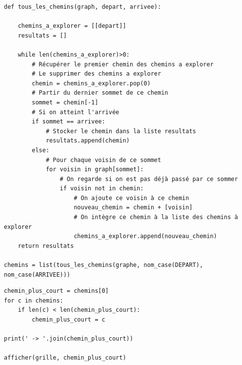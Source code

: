 \reponse{}

\begin{verbatim}
def tous_les_chemins(graph, depart, arrivee):

    chemins_a_explorer = [[depart]]
    resultats = []

    while len(chemins_a_explorer)>0:
        # Récupérer le premier chemin des chemins a explorer
        # Le supprimer des chemins a explorer
        chemin = chemins_a_explorer.pop(0)
        # Partir du dernier sommet de ce chemin
        sommet = chemin[-1]
        # Si on atteint l'arrivée
        if sommet == arrivee:
            # Stocker le chemin dans la liste resultats
            resultats.append(chemin)
        else:
            # Pour chaque voisin de ce sommet
            for voisin in graph[sommet]:
                # On regarde si on est pas déjà passé par ce sommer
                if voisin not in chemin:
                    # On ajoute ce voisin à ce chemin
                    nouveau_chemin = chemin + [voisin]
                    # On intègre ce chemin à la liste des chemins à explorer
                    chemins_a_explorer.append(nouveau_chemin)
    return resultats

chemins = list(tous_les_chemins(graphe, nom_case(DEPART), nom_case(ARRIVEE)))
\end{verbatim}

\reponse{}

\begin{verbatim}
chemin_plus_court = chemins[0]
for c in chemins:
    if len(c) < len(chemin_plus_court):
        chemin_plus_court = c

print(' -> '.join(chemin_plus_court))

afficher(grille, chemin_plus_court)
\end{verbatim}



